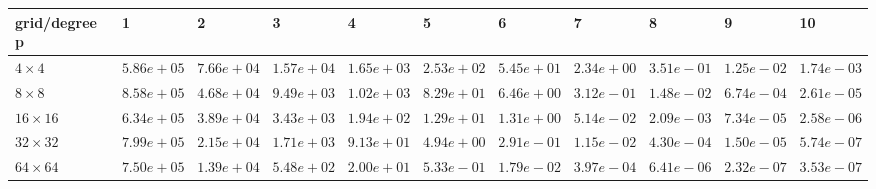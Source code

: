 \begin{tabular}{lllllllllll}
\hline
 grid/degree p   & 1          & 2          & 3          & 4          & 5          & 6          & 7          & 8          & 9          & 10         \\
\hline
 $4 \times 4$    & $5.86e+05$ & $7.66e+04$ & $1.57e+04$ & $1.65e+03$ & $2.53e+02$ & $5.45e+01$ & $2.34e+00$ & $3.51e-01$ & $1.25e-02$ & $1.74e-03$ \\
 $8 \times 8$    & $8.58e+05$ & $4.68e+04$ & $9.49e+03$ & $1.02e+03$ & $8.29e+01$ & $6.46e+00$ & $3.12e-01$ & $1.48e-02$ & $6.74e-04$ & $2.61e-05$ \\
 $16 \times 16$  & $6.34e+05$ & $3.89e+04$ & $3.43e+03$ & $1.94e+02$ & $1.29e+01$ & $1.31e+00$ & $5.14e-02$ & $2.09e-03$ & $7.34e-05$ & $2.58e-06$ \\
 $32 \times 32$  & $7.99e+05$ & $2.15e+04$ & $1.71e+03$ & $9.13e+01$ & $4.94e+00$ & $2.91e-01$ & $1.15e-02$ & $4.30e-04$ & $1.50e-05$ & $5.74e-07$ \\
 $64 \times 64$  & $7.50e+05$ & $1.39e+04$ & $5.48e+02$ & $2.00e+01$ & $5.33e-01$ & $1.79e-02$ & $3.97e-04$ & $6.41e-06$ & $2.32e-07$ & $3.53e-07$ \\
\hline
\end{tabular}